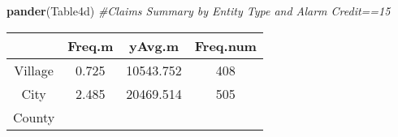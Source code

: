 \documentclass[]{book}
\newenvironment{Shaded}{\begin{snugshade}}{\end{snugshade}}
\newcommand{\KeywordTok}[1]{\textcolor[rgb]{0.13,0.29,0.53}{\textbf{#1}}}
\newcommand{\CommentTok}[1]{\textcolor[rgb]{0.56,0.35,0.01}{\textit{#1}}}
\newcommand{\NormalTok}[1]{#1}
\theoremstyle{definition}
\theoremstyle{definition}
\theoremstyle{definition}
\theoremstyle{remark}
\begin{document}
\begin{Shaded}
\begin{Highlighting}[]
\KeywordTok{pander}\NormalTok{(Table4d) }\CommentTok{#Claims Summary by Entity Type and Alarm Credit==15}
\end{Highlighting}
\end{Shaded}

\begin{longtable}[]{@{}cccc@{}}
\toprule
\begin{minipage}[b]{0.12\columnwidth}\centering\strut
~\strut
\end{minipage} & \begin{minipage}[b]{0.11\columnwidth}\centering\strut
Freq.m\strut
\end{minipage} & \begin{minipage}[b]{0.15\columnwidth}\centering\strut
yAvg.m\strut
\end{minipage} & \begin{minipage}[b]{0.15\columnwidth}\centering\strut
Freq.num\strut
\end{minipage}\tabularnewline
\midrule
\endhead
\begin{minipage}[t]{0.12\columnwidth}\centering\strut
Village\strut
\end{minipage} & \begin{minipage}[t]{0.11\columnwidth}\centering\strut
0.725\strut
\end{minipage} & \begin{minipage}[t]{0.15\columnwidth}\centering\strut
10543.752\strut
\end{minipage} & \begin{minipage}[t]{0.15\columnwidth}\centering\strut
408\strut
\end{minipage}\tabularnewline
\begin{minipage}[t]{0.12\columnwidth}\centering\strut
City\strut
\end{minipage} & \begin{minipage}[t]{0.11\columnwidth}\centering\strut
2.485\strut
\end{minipage} & \begin{minipage}[t]{0.15\columnwidth}\centering\strut
20469.514\strut
\end{minipage} & \begin{minipage}[t]{0.15\columnwidth}\centering\strut
505\strut
\end{minipage}\tabularnewline
\begin{minipage}[t]{0.12\columnwidth}\centering\strut
County\strut
\end{minipage} & \begin{minipage}[t]{0.11\columnwidth}\centering\strut

\end{minipage}
\end{longtable}
\end{document}
